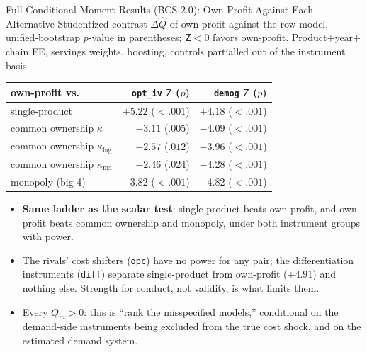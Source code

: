 \documentclass[aspectratio=169,10pt]{beamer}
\begin{document}
\begin{frame}{Full Conditional-Moment Results (BCS 2.0): Own-Profit Against Each Alternative}
\footnotesize
Studentized contrast $\Delta\widehat{Q}$ of own-profit against the row model, unified-bootstrap $p$-value in parentheses; $\mathsf{Z} < 0$ favors own-profit. Product$+$year$+$chain FE, servings weights, boosting, controls partialled out of the instrument basis.
\begin{center}
\renewcommand{\arraystretch}{1.0}
\begin{tabular}{lrr}
\toprule
own-profit vs. & \texttt{opt\_iv} $\mathsf{Z}$ ($p$) & \texttt{demog} $\mathsf{Z}$ ($p$) \\
\midrule
single-product & $+5.22$ ($<.001$) & $+4.18$ ($<.001$) \\
common ownership $\kappa$ & $-3.11$ ($.005$) & $-4.09$ ($<.001$) \\
common ownership $\kappa_{\text{lag}}$ & $-2.57$ ($.012$) & $-3.96$ ($<.001$) \\
common ownership $\kappa_{\text{ma}}$ & $-2.46$ ($.024$) & $-4.28$ ($<.001$) \\
monopoly (big 4) & $-3.82$ ($<.001$) & $-4.82$ ($<.001$) \\
\bottomrule
\end{tabular}
\end{center}
\begin{itemize}
\item \textbf{Same ladder as the scalar test}: single-product beats own-profit, and own-profit beats common ownership and monopoly, under both instrument groups with power.
\item The rivals' cost shifters (\texttt{opc}) have no power for any pair; the differentiation instruments (\texttt{diff}) separate single-product from own-profit ($+4.91$) and nothing else. Strength for conduct, not validity, is what limits them.
\item Every $Q_m > 0$: this is ``rank the misspecified models,'' conditional on the demand-side instruments being excluded from the true cost shock, and on the estimated demand system.
\end{itemize}
\end{frame}
\end{document}
